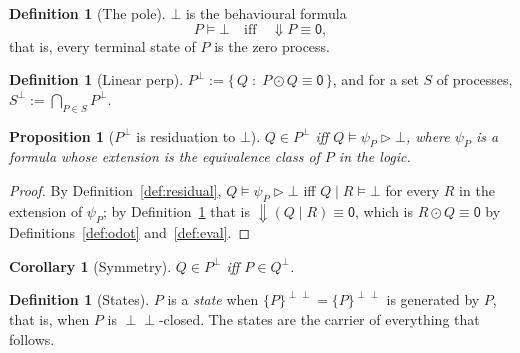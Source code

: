 \documentclass[11pt]{article}
\newtheorem{proposition}[theorem]{Proposition}
\newtheorem{corollary}[theorem]{Corollary}
\theoremstyle{definition}
\newtheorem{definition}[theorem]{Definition}
\theoremstyle{remark}
\newcommand{\pzero}{\mathsf{0}}
\newcommand{\scong}{\ensuremath{\equiv}}
\begin{document}
\begin{definition}[The pole]
\label{def:pole}
$\bot$ is the behavioural formula
\[
  P \models \bot \quad\text{iff}\quad \Downarrow P \scong \pzero,
\]
that is, every terminal state of $P$ is the zero process.
\end{definition}

\begin{definition}[Linear perp]
\label{def:perp}
$P^{\perp} := \{\, Q \;:\; P \odot Q \scong \pzero \,\}$, and for a set
$S$ of processes, $S^{\perp} := \bigcap_{P \in S} P^{\perp}$.
\end{definition}

\begin{proposition}[$P^{\perp}$ is residuation to $\bot$]
\label{prop:perpisres}
$Q \in P^{\perp}$ iff $Q \models \psi_P \rhd \bot$, where $\psi_P$ is a formula
whose extension is the equivalence class of $P$ in the logic.
\end{proposition}

\begin{proof}
By Definition~\ref{def:residual}, $Q \models \psi_P \rhd \bot$ iff
$Q \mid R \models \bot$ for every $R$ in the extension of $\psi_P$; by
Definition~\ref{def:pole} that is $\Downarrow(Q \mid R) \scong \pzero$, which is
$R \odot Q \scong \pzero$ by Definitions~\ref{def:odot} and~\ref{def:eval}.
\end{proof}

\begin{corollary}[Symmetry]
$Q \in P^{\perp}$ iff $P \in Q^{\perp}$.
\end{corollary}

\begin{definition}[States]
\label{def:states}
$P$ is a \emph{state} when $\{P\}^{\perp\perp} = \{P\}^{\perp\perp}$ is
generated by $P$, that is, when $P$ is $\perp\perp$-closed. The states are the
carrier of everything that follows.
\end{definition}
\end{document}
